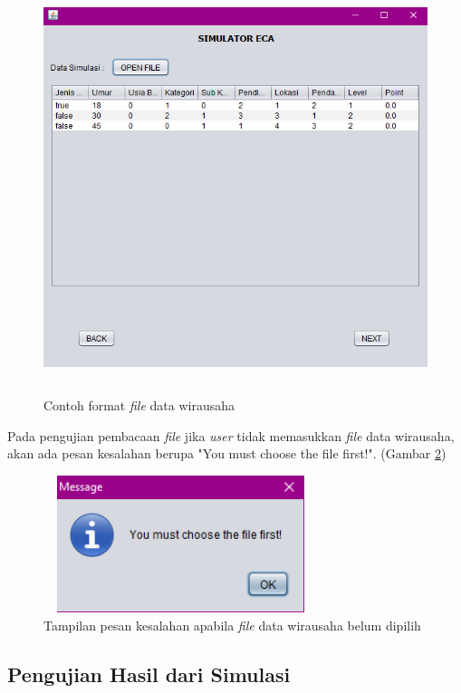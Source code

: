 	\begin{figure} [H]
	\centering  
	\includegraphics[width=12cm, height=12cm]{tampilanData} 
		\caption[Contoh format \textit{file} data wirausaha]{Contoh format \textit{file} data wirausaha}
	\label{tampilanData} 
\end{figure}

Pada pengujian pembacaan \textit{file} jika \textit{user} tidak memasukkan \textit{file} data wirausaha, akan ada pesan kesalahan berupa "You must choose the file first!". (Gambar \ref{pesanError6})

	\begin{figure} [H]
	\centering  
	\includegraphics[width=8cm, height=4cm]{pesanError6} 
		\caption[Tampilan pesan kesalahan apabila \textit{file} data wirausaha belum dipilih]{Tampilan pesan kesalahan apabila \textit{file} data wirausaha belum dipilih}
	\label{pesanError6} 
\end{figure}

 
\subsection{Pengujian Hasil dari Simulasi}

